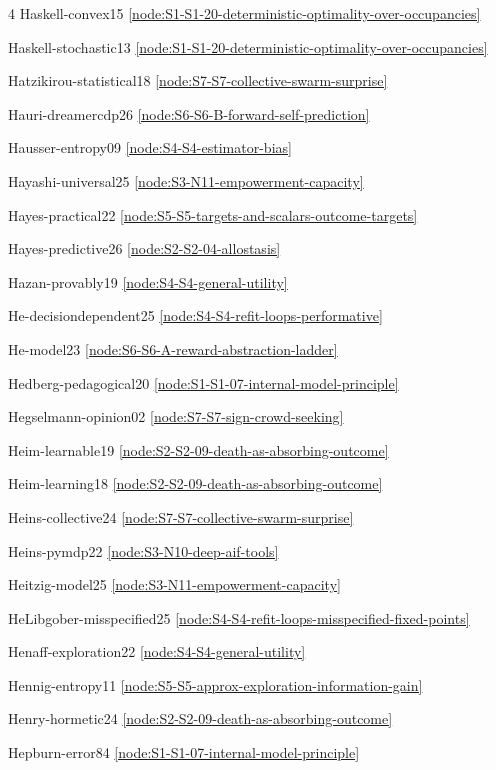 \documentclass[10pt]{article}
\begin{document}
{\begin{multicols}{4}
Haskell-convex15 \hfill \ref{node:S1-S1-20-deterministic-optimality-over-occupancies}\par
Haskell-stochastic13 \hfill \ref{node:S1-S1-20-deterministic-optimality-over-occupancies}\par
Hatzikirou-statistical18 \hfill \ref{node:S7-S7-collective-swarm-surprise}\par
Hauri-dreamercdp26 \hfill \ref{node:S6-S6-B-forward-self-prediction}\par
Hausser-entropy09 \hfill \ref{node:S4-S4-estimator-bias}\par
Hayashi-universal25 \hfill \ref{node:S3-N11-empowerment-capacity}\par
Hayes-practical22 \hfill \ref{node:S5-S5-targets-and-scalars-outcome-targets}\par
Hayes-predictive26 \hfill \ref{node:S2-S2-04-allostasis}\par
Hazan-provably19 \hfill \ref{node:S4-S4-general-utility}\par
He-decisiondependent25 \hfill \ref{node:S4-S4-refit-loops-performative}\par
He-model23 \hfill \ref{node:S6-S6-A-reward-abstraction-ladder}\par
Hedberg-pedagogical20 \hfill \ref{node:S1-S1-07-internal-model-principle}\par
Hegselmann-opinion02 \hfill \ref{node:S7-S7-sign-crowd-seeking}\par
Heim-learnable19 \hfill \ref{node:S2-S2-09-death-as-absorbing-outcome}\par
Heim-learning18 \hfill \ref{node:S2-S2-09-death-as-absorbing-outcome}\par
Heins-collective24 \hfill \ref{node:S7-S7-collective-swarm-surprise}\par
Heins-pymdp22 \hfill \ref{node:S3-N10-deep-aif-tools}\par
Heitzig-model25 \hfill \ref{node:S3-N11-empowerment-capacity}\par
HeLibgober-misspecified25 \hfill \ref{node:S4-S4-refit-loops-misspecified-fixed-points}\par
Henaff-exploration22 \hfill \ref{node:S4-S4-general-utility}\par
Hennig-entropy11 \hfill \ref{node:S5-S5-approx-exploration-information-gain}\par
Henry-hormetic24 \hfill \ref{node:S2-S2-09-death-as-absorbing-outcome}\par
Hepburn-error84 \hfill \ref{node:S1-S1-07-internal-model-principle}\par

\end{multicols}}
\end{document}

